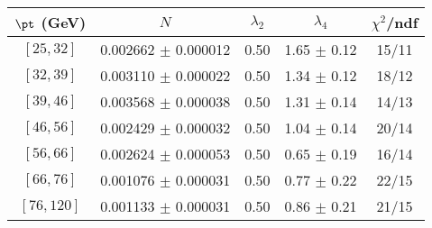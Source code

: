 \begin{tabular}{c||c|c|c|c}
$\pt$ (GeV) & $N$ & $\lambda_{2}$ & $\lambda_4$  & $\chi^2$/ndf  \\
\hline
$[25, 32]$ & 0.002662 $\pm$ 0.000012 & 0.50 & 1.65 $\pm$ 0.12 & 15/11\\
$[32, 39]$ & 0.003110 $\pm$ 0.000022 & 0.50 & 1.34 $\pm$ 0.12 & 18/12\\
$[39, 46]$ & 0.003568 $\pm$ 0.000038 & 0.50 & 1.31 $\pm$ 0.14 & 14/13\\
$[46, 56]$ & 0.002429 $\pm$ 0.000032 & 0.50 & 1.04 $\pm$ 0.14 & 20/14\\
$[56, 66]$ & 0.002624 $\pm$ 0.000053 & 0.50 & 0.65 $\pm$ 0.19 & 16/14\\
$[66, 76]$ & 0.001076 $\pm$ 0.000031 & 0.50 & 0.77 $\pm$ 0.22 & 22/15\\
$[76, 120]$ & 0.001133 $\pm$ 0.000031 & 0.50 & 0.86 $\pm$ 0.21 & 21/15\\
\end{tabular}
